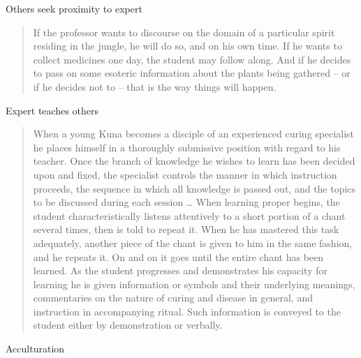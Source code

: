 \documentclass[
]{article}
\begin{document}
Others seek proximity to expert

\begin{quote}
If the professor wants to discourse on the domain of a particular spirit residing in the jungle, he will do so, and on his own time. If he wants to collect medicines one day, the student may follow along. And if he decides to pass on some esoteric information about the plants being gathered -- or if he decides not to -- that is the way things will happen.
\end{quote}

Expert teaches others

\begin{quote}
When a young Kuna becomes a disciple of an experienced curing specialist he places himself in a thoroughly submissive position with regard to his teacher. Once the branch of knowledge he wishes to learn has been decided upon and fixed, the specialist controls the manner in which instruction proceeds, the sequence in which all knowledge is passed out, and the topics to be discussed during each session \ldots{} When learning proper begins, the student characteristically listens attentively to a short portion of a chant several times, then is told to repeat it. When he has mastered this task adequately, another piece of the chant is given to him in the same fashion, and he repeats it. On and on it goes until the entire chant has been learned. As the student progresses and demonstrates his capacity for learning he is given information or symbols and their underlying meanings, commentaries on the nature of curing and disease in general, and instruction in accompanying ritual. Such information is conveyed to the student either by demonstration or verbally.
\end{quote}

Acculturation
\end{document}
